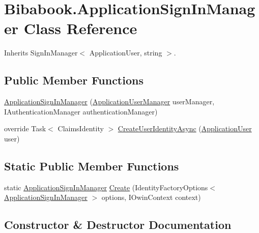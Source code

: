 \hypertarget{class_bibabook_1_1_application_sign_in_manager}{}\section{Bibabook.\+Application\+Sign\+In\+Manager Class Reference}
\label{class_bibabook_1_1_application_sign_in_manager}


Inherits Sign\+In\+Manager$<$ Application\+User, string $>$.

\subsection*{Public Member Functions}
\begin{DoxyCompactItemize}
\item 
\hyperlink{class_bibabook_1_1_application_sign_in_manager_ae29ed89058a5dca31e30707e764e0a98}{Application\+Sign\+In\+Manager} (\hyperlink{class_bibabook_1_1_application_user_manager}{Application\+User\+Manager} user\+Manager, I\+Authentication\+Manager authentication\+Manager)
\item 
override Task$<$ Claims\+Identity $>$ \hyperlink{class_bibabook_1_1_application_sign_in_manager_ac40e93d1db3011e573b0fc153796b054}{Create\+User\+Identity\+Async} (\hyperlink{class_bibabook_1_1_models_1_1_application_user}{Application\+User} user)
\end{DoxyCompactItemize}
\subsection*{Static Public Member Functions}
\begin{DoxyCompactItemize}
\item 
static \hyperlink{class_bibabook_1_1_application_sign_in_manager}{Application\+Sign\+In\+Manager} \hyperlink{class_bibabook_1_1_application_sign_in_manager_a4ad054f1455ae76786330e4759ce7aa4}{Create} (Identity\+Factory\+Options$<$ \hyperlink{class_bibabook_1_1_application_sign_in_manager}{Application\+Sign\+In\+Manager} $>$ options, I\+Owin\+Context context)
\end{DoxyCompactItemize}


\subsection{Constructor \& Destructor Documentation}
\hypertarget{class_bibabook_1_1_application_sign_in_manager_ae29ed89058a5dca31e30707e764e0a98}{}
